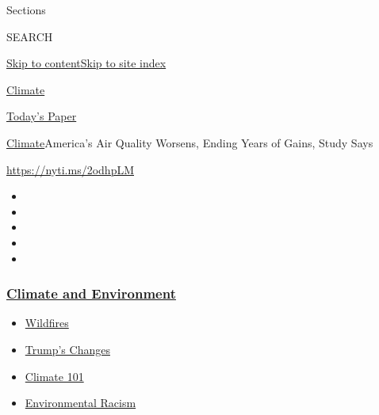 Sections

SEARCH

\protect\hyperlink{site-content}{Skip to
content}\protect\hyperlink{site-index}{Skip to site index}

\href{https://www.nytimes3xbfgragh.onion/section/climate}{Climate}

\href{https://myaccount.nytimes3xbfgragh.onion/auth/login?response_type=cookie\&client_id=vi}{}

\href{https://www.nytimes3xbfgragh.onion/section/todayspaper}{Today's
Paper}

\href{/section/climate}{Climate}\textbar{}America's Air Quality Worsens,
Ending Years of Gains, Study Says

\url{https://nyti.ms/2odhpLM}

\begin{itemize}
\item
\item
\item
\item
\item
\end{itemize}

\hypertarget{climate-and-environment}{%
\subsubsection{\texorpdfstring{\href{https://www.nytimes3xbfgragh.onion/section/climate?name=styln-climate\&region=TOP_BANNER\&block=storyline_menu_recirc\&action=click\&pgtype=Interactive\&impression_id=2b2092a0-f4be-11ea-9caa-f145e0172db9\&variant=undefined}{Climate
and
Environment}}{Climate and Environment}}\label{climate-and-environment}}

\begin{itemize}
\tightlist
\item
  \href{https://www.nytimes3xbfgragh.onion/2020/09/08/climate/california-wildfires-climate.html?name=styln-climate\&region=TOP_BANNER\&block=storyline_menu_recirc\&action=click\&pgtype=Interactive\&impression_id=2b20b9b0-f4be-11ea-9caa-f145e0172db9\&variant=undefined}{Wildfires}
\item
  \href{https://www.nytimes3xbfgragh.onion/interactive/2020/climate/trump-environment-rollbacks.html?name=styln-climate\&region=TOP_BANNER\&block=storyline_menu_recirc\&action=click\&pgtype=Interactive\&impression_id=2b20b9b1-f4be-11ea-9caa-f145e0172db9\&variant=undefined}{Trump's
  Changes}
\item
  \href{https://www.nytimes3xbfgragh.onion/interactive/2020/04/19/climate/climate-crash-course-1.html?name=styln-climate\&region=TOP_BANNER\&block=storyline_menu_recirc\&action=click\&pgtype=Interactive\&impression_id=2b20b9b2-f4be-11ea-9caa-f145e0172db9\&variant=undefined}{Climate
  101}
\item
  \href{https://www.nytimes3xbfgragh.onion/interactive/2020/08/24/climate/racism-redlining-cities-global-warming.html?name=styln-climate\&region=TOP_BANNER\&block=storyline_menu_recirc\&action=click\&pgtype=Interactive\&impression_id=2b20b9b3-f4be-11ea-9caa-f145e0172db9\&variant=undefined}{Environmental
  Racism}
\end{itemize}

